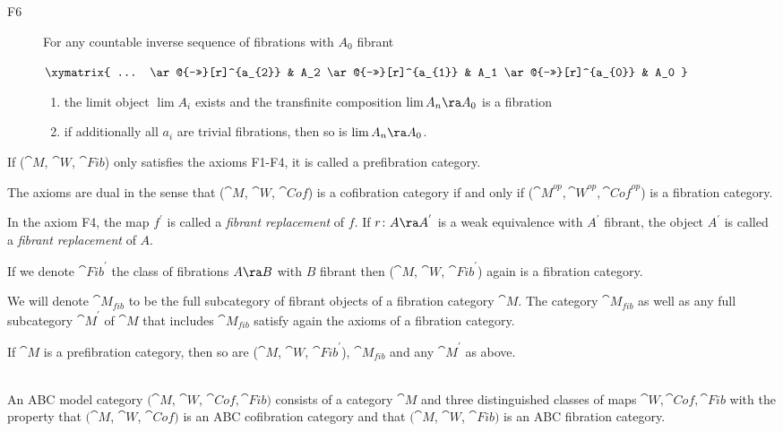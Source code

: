 \begin{defn}
\begin{description}
\item[F6]
For any countable inverse sequence of fibrations with $A_0$ fibrant
\begin{center}
$ \xymatrix {
    ... \ar@{->>}[r]^{a_{2}} &
    A_2 \ar@{->>}[r]^{a_{1}} &
    A_1 \ar@{->>}[r]^{a_{0}} &
    A_0
  }$
\end{center}
\begin{enumerate}
\item
the limit object $\lim A_i$ exists and the transfinite composition $\lim A_n \ra A_0$ is a fibration
\item
if additionally all $a_i$ are trivial fibrations, then so is $\lim A_n \ra A_0$.
\end{enumerate}
\end{description}

If (${\cat M}$, ${\cat W}$, ${\cat Fib}$) only satisfies the axioms F1-F4, it is called a prefibration category.
\end{defn}

The axioms are dual in the sense that (${\cat M}$, ${\cat W}$, ${\cat Cof}$) is a cofibration category if and only if (${\cat M}^{op}, {\cat W}^{op}, {\cat Cof}^{op}$) is a fibration category. 

In the axiom F4, the map $f^{'}$ is called a {\it fibrant replacement} of $f$. If $r \colon A \ra A^{'}$ is a weak equivalence with $A^{'}$ fibrant, the object $A^{'}$ is called a {\it fibrant replacement} of $A$.

If we denote ${\cat Fib}^{'}$ the class of fibrations $A \ra B$ with $B$ fibrant then (${\cat M}$, ${\cat W}$, ${\cat Fib}^{'}$) again is a fibration category.

We will denote ${\cat M}_{fib}$ to be the full subcategory of fibrant objects of a fibration category ${\cat M}$.  The category ${\cat M}_{fib}$ as well as any full subcategory ${\cat M}^{'}$ of ${\cat M}$ that includes ${\cat M}_{fib}$ satisfy again the axioms of a fibration category. 

If ${\cat M}$ is a prefibration category, then so are (${\cat M}$, ${\cat W}$, ${\cat Fib}^{'}$), ${\cat M}_{fib}$ and any ${\cat M}^{'}$ as above.

\begin{defn}
\label{defn:abcmodel}
\mbox{} \\
An ABC model category  $({\cat M}$, ${\cat W}$, ${\cat Cof}, {\cat Fib})$ consists of a category ${\cat M}$ and three distinguished classes of maps ${\cat W}, {\cat Cof}, {\cat Fib}$ with the property that $({\cat M}$, ${\cat W}$, ${\cat Cof})$ is an ABC cofibration category and that $({\cat M}$, ${\cat W}$, ${\cat Fib})$ is an ABC fibration category.
\end{defn}

